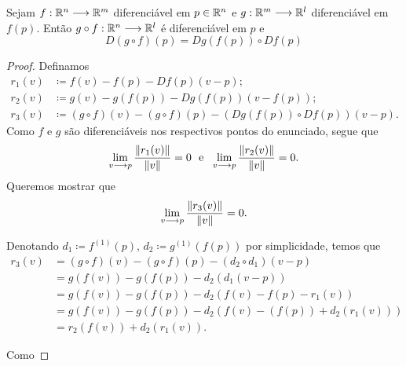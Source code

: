 \begin{prop}
	Sejam $f: \mathbb{R}^n \longrightarrow \mathbb{R}^m$ diferenciável em $p \in \mathbb{R}^n$ e $g: \mathbb{R}^m \longrightarrow \mathbb{R}^l$ diferenciável em $f(p)$. Então $g \circ f: \mathbb{R}^n \longrightarrow \mathbb{R}^l$ é diferenciável em $p$ e
	\begin{equation*}
	D (g \circ f)(p) = D g(f(p)) \circ D f(p)
	\end{equation*}
\end{prop}
\begin{proof} Definamos
	\begin{align*}
	r_1(v) &\coloneqq f(v) - f(p) - Df(p)(v-p); \\
	r_2(v) &\coloneqq g(v) - g(f(p)) - Dg(f(p))(v-f(p)); \\
	r_3(v) &\coloneqq (g \circ f)(v) - (g \circ f)(p) - (Dg(f(p)) \circ Df(p))(v-p).
	\end{align*}
Como $f$ e $g$ são diferenciáveis nos respectivos pontos do enunciado, segue que
	\begin{equation*}
	\lim_{v \longrightarrow p} \frac{\left\Vert{r_1(v)}\right\Vert}{\left\Vert{v}\right\Vert} = 0 \text{\ \ e\ \ } \lim_{v \longrightarrow p} \frac{\left\Vert{r_2(v)}\right\Vert}{\left\Vert{v}\right\Vert} = 0.
	\end{equation*}
Queremos mostrar que
	\begin{equation*}
	\lim_{v \longrightarrow p} \frac{\left\Vert{r_3(v)}\right\Vert}{\left\Vert{v}\right\Vert} = 0.
	\end{equation*}	
	
Denotando $d_1 \coloneqq f^{(1)}(p)$, $d_2 \coloneqq g^{(1)}(f(p))$ por simplicidade, temos que
	\begin{align*}
	r_3(v) &= (g \circ f)(v) - (g \circ f)(p) - (d_2 \circ d_1)(v-p) \\
			&= g(f(v)) - g(f(p)) - d_2(d_1(v-p)) \\
			&= g(f(v)) - g(f(p)) - d_2(f(v) - f(p) - r_1(v)) \\
			&= g(f(v)) - g(f(p)) - d_2(f(v) - (f(p)) + d_2(r_1(v))) \\
			&= r_2(f(v)) + d_2(r_1(v)).
	\end{align*}

Como 
	
	
	
	
	
	
	
	










	
	
	
	
	
	

\end{proof}
